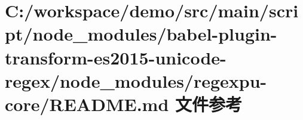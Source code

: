 \hypertarget{node__modules_2babel-plugin-transform-es2015-unicode-regex_2node__modules_2regexpu-core_2_r_e_a_d_m_e_8md}{}\section{C\+:/workspace/demo/src/main/script/node\+\_\+modules/babel-\/plugin-\/transform-\/es2015-\/unicode-\/regex/node\+\_\+modules/regexpu-\/core/\+R\+E\+A\+D\+ME.md 文件参考}
\label{node__modules_2babel-plugin-transform-es2015-unicode-regex_2node__modules_2regexpu-core_2_r_e_a_d_m_e_8md}
